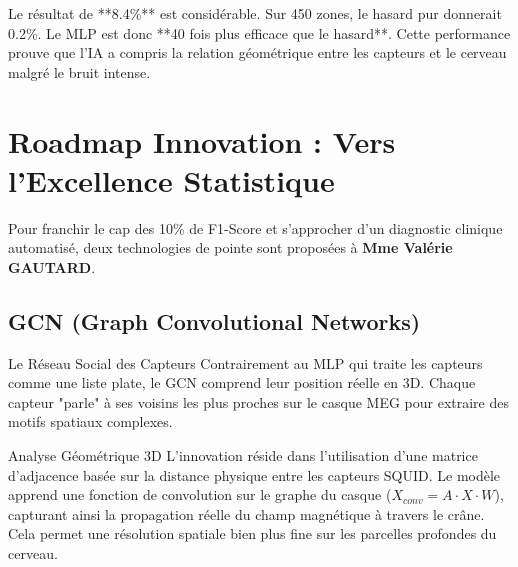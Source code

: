\documentclass[a4paper,11pt]{article}
\begin{document}
\begin{tcolorbox}[colback=green!5, colframe=green!50!black, arc=3mm, title=Interprétation Médico-Technique]
    Le résultat de **8.4\%** est considérable. Sur 450 zones, le hasard pur donnerait 0.2\%. Le MLP est donc **40 fois plus efficace que le hasard**. Cette performance prouve que l'IA a compris la relation géométrique entre les capteurs et le cerveau malgré le bruit intense.
\end{tcolorbox}

\section{Roadmap Innovation : Vers l'Excellence Statistique}
Pour franchir le cap des 10\% de F1-Score et s'approcher d'un diagnostic clinique automatisé, deux technologies de pointe sont proposées à \textbf{Mme Valérie GAUTARD}.

\subsection{GCN (Graph Convolutional Networks)}
\begin{intuitionbox}{Le Réseau Social des Capteurs}
    Contrairement au MLP qui traite les capteurs comme une liste plate, le GCN comprend leur position réelle en 3D. Chaque capteur "parle" à ses voisins les plus proches sur le casque MEG pour extraire des motifs spatiaux complexes.
\end{intuitionbox}
\begin{techbox}{Analyse Géométrique 3D}
    L'innovation réside dans l'utilisation d'une matrice d'adjacence basée sur la distance physique entre les capteurs SQUID. Le modèle apprend une fonction de convolution sur le graphe du casque (\(X_{conv} = A \cdot X \cdot W\)), capturant ainsi la propagation réelle du champ magnétique à travers le crâne. Cela permet une résolution spatiale bien plus fine sur les parcelles profondes du cerveau.
\end{techbox}
\end{document}
